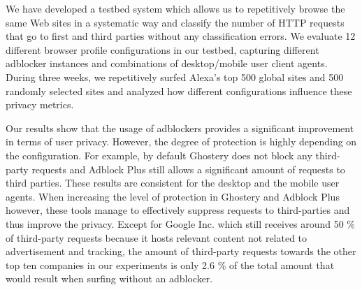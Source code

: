 \documentclass[compsoc, conference, letterpaper, 10pt, times]{IEEEtran}
\begin{document}
We have developed a testbed system which allows us to repetitively browse the same Web sites in a systematic way and classify the number of HTTP requests that go to first and third parties without any classification errors.
We evaluate 12 different browser profile configurations in our testbed, capturing different adblocker instances and combinations of desktop/mobile user client agents. During three weeks, we repetitively surfed Alexa's top 500 global sites and 500 randomly selected sites and analyzed how different configurations influence these privacy metrics. 


Our results show that the usage of adblockers provides a significant improvement in terms of user privacy.
However, the degree of protection is highly depending on the configuration. For example, by default Ghostery does not block any third-party requests and Adblock Plus still allows a significant amount of requests to third parties. These results are consistent for the desktop and the mobile user agents. When increasing the level of protection in Ghostery and Adblock Plus however, these tools manage to effectively suppress requests to third-parties and thus improve the privacy. Except for Google Inc. which still receives around 50 \% of third-party requests because it hosts relevant content not related to advertisement and tracking, the amount of third-party requests towards the other top ten companies in our experiments is only 2.6 \% of the total amount that would result when surfing without an adblocker. 



\end{document}
